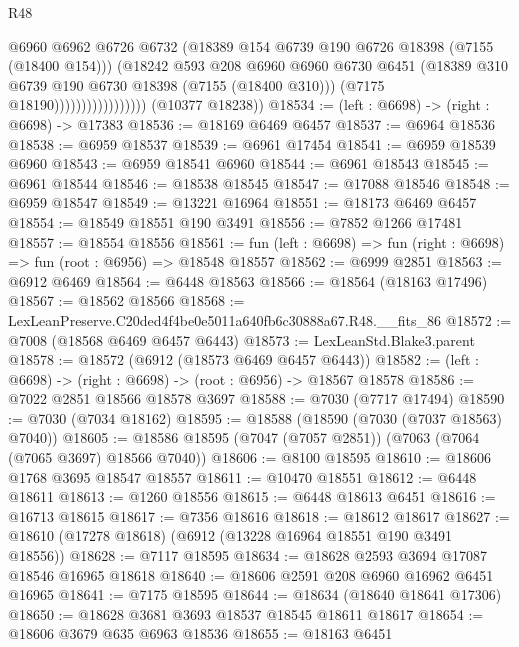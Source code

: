\begin{lexlean}{R48}
\begin{coremodule}
                                    @6960
                                    @6962
                                    @6726
                                    @6732
                                    (@18389 @154 @6739 @190 @6726 @18398 (@7155 (@18400 @154)))
                                    (@18242
                                      @593
                                      @208
                                      @6960
                                      @6960
                                      @6730
                                      @6451
                                      (@18389 @310 @6739 @190 @6730 @18398 (@7155 (@18400 @310)))
                                      (@7175 @18190)))))))))))))))))
      (@10377 @18238))
@18534 := (left : @6698) -> (right : @6698) -> @17383
@18536 := @18169 @6469 @6457
@18537 := @6964 @18536
@18538 := @6959 @18537
@18539 := @6961 @17454
@18541 := @6959 @18539 @6960
@18543 := @6959 @18541 @6960
@18544 := @6961 @18543
@18545 := @6961 @18544
@18546 := @18538 @18545
@18547 := @17088 @18546
@18548 := @6959 @18547
@18549 := @13221 @16964
@18551 := @18173 @6469 @6457
@18554 := @18549 @18551 @190 @3491
@18556 := @7852 @1266 @17481
@18557 := @18554 @18556
@18561 := fun (left : @6698) => fun (right : @6698) => fun (root : @6956) => @18548 @18557
@18562 := @6999 @2851
@18563 := @6912 @6469
@18564 := @6448 @18563
@18566 := @18564 (@18163 @17496)
@18567 := @18562 @18566
@18568 := LexLeanPreserve.C20ded4f4be0e5011a640fb6c30888a67.R48.__fits_86
@18572 := @7008 (@18568 @6469 @6457 @6443)
@18573 := LexLeanStd.Blake3.parent
@18578 := @18572 (@6912 (@18573 @6469 @6457 @6443))
@18582 := (left : @6698) -> (right : @6698) -> (root : @6956) -> @18567 @18578
@18586 := @7022 @2851 @18566 @18578 @3697
@18588 := @7030 (@7717 @17494)
@18590 := @7030 (@7034 @18162)
@18595 := @18588 (@18590 (@7030 (@7037 @18563) @7040))
@18605 := @18586 @18595 (@7047 (@7057 @2851)) (@7063 (@7064 (@7065 @3697) @18566 @7040))
@18606 := @8100 @18595
@18610 := @18606 @1768 @3695 @18547 @18557
@18611 := @10470 @18551
@18612 := @6448 @18611
@18613 := @1260 @18556
@18615 := @6448 @18613 @6451
@18616 := @16713 @18615
@18617 := @7356 @18616
@18618 := @18612 @18617
@18627 := @18610 (@17278 @18618) (@6912 (@13228 @16964 @18551 @190 @3491 @18556))
@18628 := @7117 @18595
@18634 := @18628 @2593 @3694 @17087 @18546 @16965 @18618
@18640 := @18606 @2591 @208 @6960 @16962 @6451 @16965
@18641 := @7175 @18595
@18644 := @18634 (@18640 @18641 @17306)
@18650 := @18628 @3681 @3693 @18537 @18545 @18611 @18617
@18654 := @18606 @3679 @635 @6963 @18536
@18655 := @18163 @6451

\end{coremodule}
\end{lexlean}
